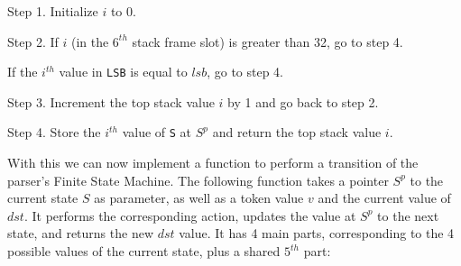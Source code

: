 \begin{Paragraph}
\begin{paracol}{2}

Step 1. Initialize $i$ to 0.


Step 2. If $i$ (in the $6^{th}$ stack frame slot) is greater than 32, go to
step 4.


If the $i^{th}$ value in {\tt LSB} is equal to $lsb$, go to step 4.


Step 3. Increment the top stack value $i$ by 1 and go back to step 2.


Step 4. Store the $i^{th}$ value of {\tt S} at $S^p$ and return the top stack
value $i$.

\end{paracol}
\end{Paragraph}

With this we can now implement a function to perform a transition of the
parser's Finite State Machine. The following function takes a pointer $S^p$ to
the current state $S$ as parameter, as well as a token value $v$ and the
current value of $dst$. It performs the corresponding action, updates the value
at $S^p$ to the next state, and returns the new $dst$ value. It has 4 main
parts, corresponding to the 4 possible values of the current state, plus a
shared $5^{th}$ part:

